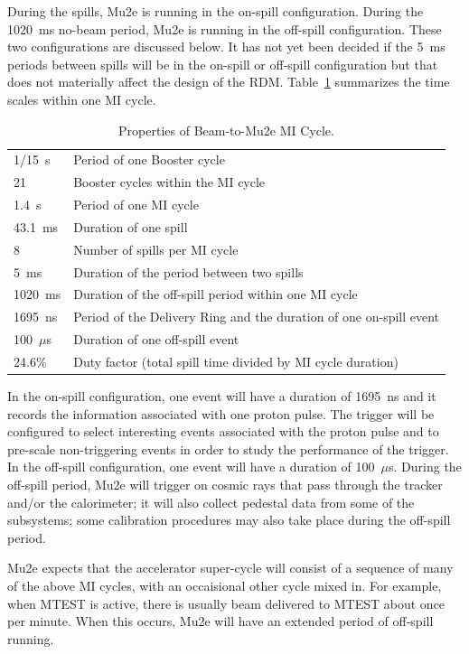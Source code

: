 During the spills, Mu2e is running in the on-spill configuration.
During the 1020~ms no-beam period, Mu2e is running in the off-spill configuration.
These two configurations are discussed below.
It has not yet been decided if the 5~ms periods between spills will
be in the on-spill or off-spill configuration
but that does not materially affect the design of the RDM.
Table~\ref{tab:timescales} summarizes the time scales within one MI cycle.
\begin{table}
\begin{center}
\caption[Properties of the Beam-to-Mu2e MI Cycle]{Properties of Beam-to-Mu2e MI Cycle.}
\label{tab:timescales}
\begin{tabular}{ll}\hline
   1/15~s & Period of one Booster cycle \\
   21     & Booster cycles within the MI cycle \\
   1.4~s  & Period of one MI cycle \\
   43.1~ms & Duration of one spill \\
   8       & Number of spills per MI cycle \\
    5~ms   & Duration of the period between two spills \\
   1020~ms & Duration of the off-spill period within one MI cycle \\
   1695~ns & Period of the Delivery Ring and the duration of one on-spill event\\
   100~$\mu$s & Duration of one off-spill event \\
   24.6\%     & Duty factor (total spill time divided by MI cycle duration)\\
   \hline
  \end{tabular}
\end{center}
\end{table}


In the on-spill configuration, one event will have  a duration of 1695~ns
and it records the information associated with one proton pulse.
The trigger will be configured to select interesting events associated with the proton pulse
and to pre-scale non-triggering events in order to study the performance of the trigger.
In the off-spill configuration, one event will have a duration of 100~$\mu$s.
During the off-spill period, Mu2e will trigger on cosmic rays that
pass through the tracker and/or the calorimeter; it will also collect
pedestal data from some of the subsystems; some calibration procedures
may also take place during the off-spill period.

Mu2e expects that the accelerator super-cycle will consist of a
sequence of many of the above MI cycles,
with an occaisional other cycle mixed in.
For example, when MTEST is active, there is usually beam delivered to MTEST about once per minute.
When this occurs, Mu2e will have an extended period of off-spill running.

